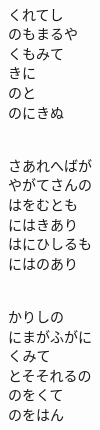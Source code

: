 \documentclass[10pt,b5j]{tarticle} %
\begin{document}
\vspace{1.5em} %
\newcommand{\linespace}{0.5em} %
\newcommand{\blocksize}{0.5\hsize} %
\newcommand{\itemmargin}{6em} %
\begin{enumerate} %
    \setlength{\itemindent}{\itemmargin} %
    \begin{minipage}[c]{\blocksize}
    
        \vspace{\linespace}
        \item~\\
        くれてし\\
        のもまるや\\
        くもみて\\
        きに\\
        のと\\
        のにきぬ
        
        \vspace{\linespace}
        \item~\\
        さあれへばが\\
        やがてさんの\\
        はをむとも\\
        にはきあり\\
        はにひしるも\\
        にはのあり
        
        \vspace{\linespace}
        \item~\\
        かりしの\\
        にまがふがに\\
        くみて\\
        とそそれるの\\
        のをくて\\
        のをはん
        

\end{minipage}
\end{enumerate}
\end{document}
